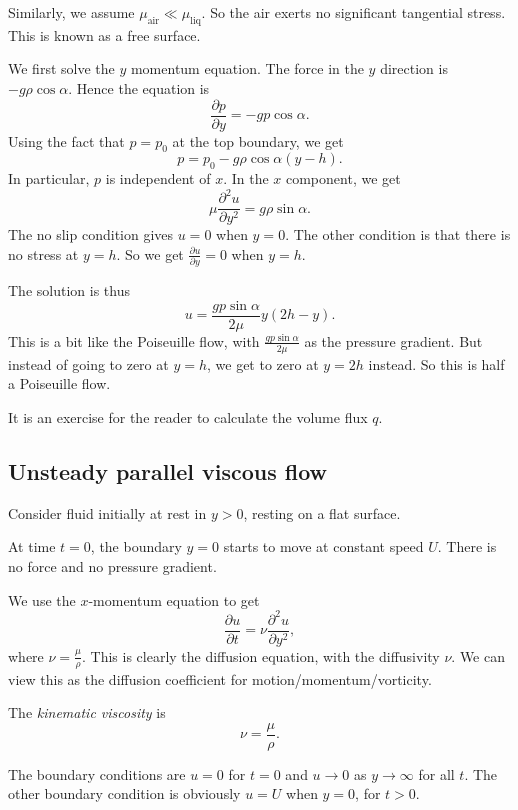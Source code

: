 \documentclass[a4paper]{article}
\begin{document}
Similarly, we assume $\mu_{\mathrm{air}} \ll \mu_{\mathrm{liq}}$. So the air exerts no significant tangential stress. This is known as a free surface.

We first solve the $y$ momentum equation. The force in the $y$ direction is $-g \rho \cos \alpha$. Hence the equation is
\[
  \frac{\partial p}{\partial y} = - gp \cos \alpha.
\]
Using the fact that $p = p_0$ at the top boundary, we get
\[
  p = p_0 - g\rho \cos \alpha (y - h).
\]
In particular, $p$ is independent of $x$. In the $x$ component, we get
\[
  \mu \frac{\partial^2 u}{\partial y^2} = g\rho \sin \alpha.
\]
The no slip condition gives $u = 0$ when $y = 0$. The other condition is that there is no stress at $y = h$. So we get $\frac{\partial u}{\partial y} = 0$ when $y = h$.

The solution is thus
\[
  u = \frac{gp\sin \alpha}{2 \mu} y(2h - y).
\]
This is a bit like the Poiseuille flow, with $\frac{gp \sin \alpha}{2\mu}$ as the pressure gradient. But instead of going to zero at $y = h$, we get to zero at $y = 2h$ instead. So this is half a Poiseuille flow. %

It is an exercise for the reader to calculate the volume flux $q$.

\subsection{Unsteady parallel viscous flow}
Consider fluid initially at rest in $y > 0$, resting on a flat surface.
\begin{center}
\end{center}
At time $t = 0$, the boundary $y = 0$ starts to move at constant speed $U$. There is no force and no pressure gradient.

We use the $x$-momentum equation to get
\[
  \frac{\partial u}{\partial t} = \nu \frac{\partial^2 u}{\partial y^2},
\]
where $\nu = \frac{\mu}{\rho}$. This is clearly the diffusion equation, with the diffusivity $\nu$. We can view this as the diffusion coefficient for motion/momentum/vorticity.
\begin{defi}
  The \emph{kinematic viscosity} is
  \[
    \nu = \frac{\mu}{\rho}.
  \]
\end{defi}
The boundary conditions are $u = 0$ for $t = 0$ and $u \to 0$ as $y \to \infty$ for all $t$. The other boundary condition is obviously $u = U$ when $y = 0$, for $t > 0$.
\end{document}
